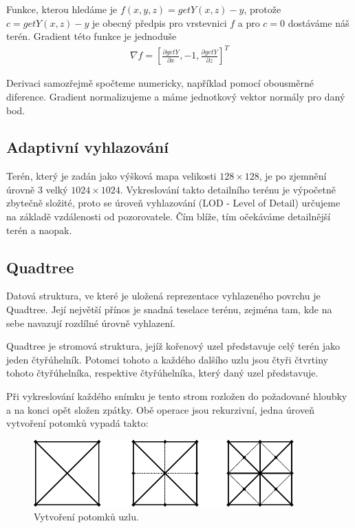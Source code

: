 \documentclass[11pt]{article}
\begin{document}
Funkce, kterou hledáme je $f(x, y, z) = getY(x, z) - y$, protože $c = getY(x,
z) - y$ je obecný předpis pro vrstevnici $f$ a pro $c = 0$ dostáváme náš terén. 
Gradient této funkce je jednoduše
\begin{align*}
\nabla f = \left[ \frac{\partial getY}{\partial x}, -1, \frac{\partial getY}{\partial z} \right]^T
\end{align*}

Derivaci samozřejmě spočteme numericky, například pomocí obousměrné diference.
Gradient normalizujeme a máme jednotkový vektor normály pro daný bod.

\subsection{Adaptivní vyhlazování}
Terén, který je zadán jako výšková mapa velikosti $128\times128$, je po
zjemnění úrovně 3 velký $1024\times1024$. Vykreslování takto detailního terénu
je výpočetně zbytečně složité, proto se úroveň vyhlazování (LOD - Level of
Detail) určujeme na základě vzdálenosti od pozorovatele. Čím blíže, tím
očekáváme detailnější terén a naopak. 

\subsection{Quadtree}
Datová struktura, ve které je uložená reprezentace vyhlazeného povrchu je
Quadtree. Její největší přínos je snadná teselace terénu, zejména tam, kde na
sebe navazují rozdílné úrovně vyhlazení.

Quadtree je stromová struktura, jejíž kořenový uzel představuje celý terén jako
jeden čtyřúhelník. Potomci tohoto a každého dalšího uzlu jsou čtyři čtvrtiny
tohoto čtyřúhelníka, respektive čtyřúhelníka, který daný uzel představuje.

Při vykreslování každého snímku je tento strom rozložen do požadované
hloubky a na konci opět složen zpátky. Obě operace jsou rekurzivní,
jedna úroveň vytvoření potomků vypadá takto:


\begin{figure}[ht!]
\centering
	\includegraphics[width=10cm]{subd.pdf}
	\caption{Vytvoření potomků uzlu.}
\end{figure}
\end{document}
